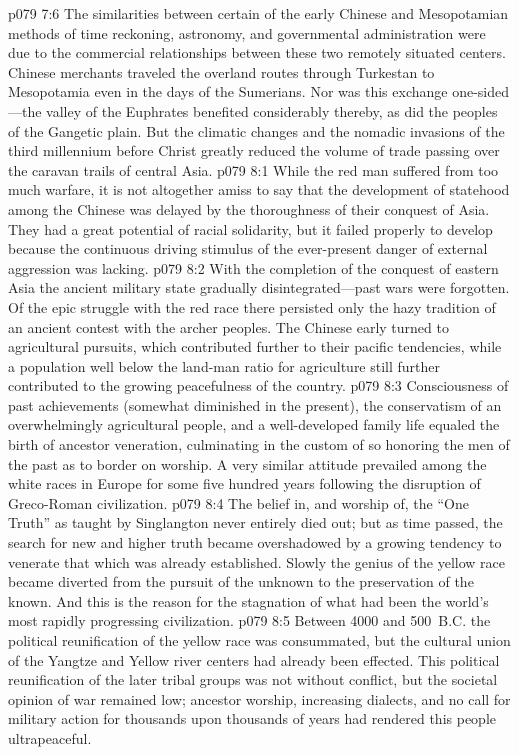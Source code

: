 \vs p079 7:6 The similarities between certain of the early Chinese and Mesopotamian methods of time reckoning, astronomy, and governmental administration were due to the commercial relationships between these two remotely situated centers. Chinese merchants traveled the overland routes through Turkestan to Mesopotamia even in the days of the Sumerians. Nor was this exchange one\hyp{}sided---the valley of the Euphrates benefited considerably thereby, as did the peoples of the Gangetic plain. But the climatic changes and the nomadic invasions of the third millennium before Christ greatly reduced the volume of trade passing over the caravan trails of central Asia.
\vs p079 8:1 While the red man suffered from too much warfare, it is not altogether amiss to say that the development of statehood among the Chinese was delayed by the thoroughness of their conquest of Asia. They had a great potential of racial solidarity, but it failed properly to develop because the continuous driving stimulus of the ever\hyp{}present danger of external aggression was lacking.
\vs p079 8:2 With the completion of the conquest of eastern Asia the ancient military state gradually disintegrated---past wars were forgotten. Of the epic struggle with the red race there persisted only the hazy tradition of an ancient contest with the archer peoples. The Chinese early turned to agricultural pursuits, which contributed further to their pacific tendencies, while a population well below the land\hyp{}man ratio for agriculture still further contributed to the growing peacefulness of the country.
\vs p079 8:3 Consciousness of past achievements (somewhat diminished in the present), the conservatism of an overwhelmingly agricultural people, and a well\hyp{}developed family life equaled the birth of ancestor veneration, culminating in the custom of so honoring the men of the past as to border on worship. A very similar attitude prevailed among the white races in Europe for some five hundred years following the disruption of Greco\hyp{}Roman civilization.
\vs p079 8:4 The belief in, and worship of, the “One Truth” as taught by Singlangton never entirely died out; but as time passed, the search for new and higher truth became overshadowed by a growing tendency to venerate that which was already established. Slowly the genius of the yellow race became diverted from the pursuit of the unknown to the preservation of the known. And this is the reason for the stagnation of what had been the world’s most rapidly progressing civilization.
\pc \vs p079 8:5 Between 4000 and 500~B.C. the political reunification of the yellow race was consummated, but the cultural union of the Yangtze and Yellow river centers had already been effected. This political reunification of the later tribal groups was not without conflict, but the societal opinion of war remained low; ancestor worship, increasing dialects, and no call for military action for thousands upon thousands of years had rendered this people ultrapeaceful.
